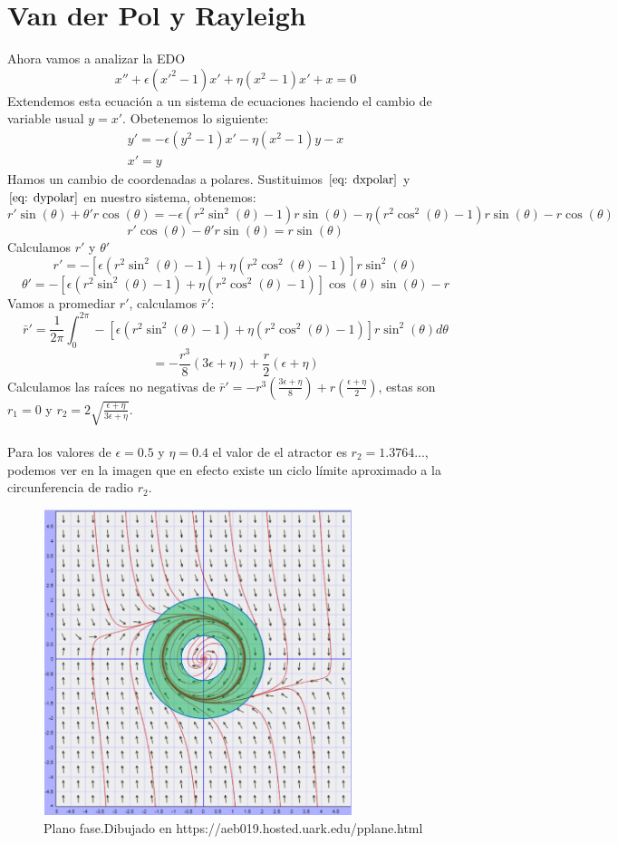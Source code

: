 \documentclass[12pt, a4paper]{report}
\begin{document}
\section{Van der Pol y Rayleigh}
Ahora vamos a analizar la EDO
\begin{equation}\label{eq: vdpr}
	x''+\epsilon(x'^2-1)x'+\eta(x^2-1)x'+x=0
\end{equation}
Extendemos esta ecuación a un sistema de ecuaciones haciendo el
cambio de variable usual $y=x'$. Obetenemos lo siguiente:
\begin{equation}\label{eq: vpdrsis}
	\begin{matrix}
		y'=-\epsilon(y^2-1)x'-\eta(x^2-1)y-x \\
		x'=y
	\end{matrix}
\end{equation}
Hamos un cambio de coordenadas a polares. Sustituimos $\eqref{eq: dxpolar}$ y
$\eqref{eq: dypolar}$ en nuestro sistema, obtenemos:
$$r'\sin(\theta)+\theta'r\cos(\theta)=-\epsilon(r^2\sin^2(\theta)-1)r\sin(\theta)-\eta(r^2\cos^2(\theta)-1)r\sin(\theta)-r\cos(\theta)$$
$$r'\cos(\theta)-\theta'r\sin(\theta)=r\sin(\theta)$$
Calculamos $r'$ y $\theta'$
\begin{equation}\label{eq: drvdpr}
	r'=-[\epsilon(r^2\sin^2(\theta)-1)+\eta(r^2\cos^2(\theta)-1)]r\sin^2(\theta)
\end{equation}
$$\theta'=-[\epsilon(r^2\sin^2(\theta)-1)+\eta(r^2\cos^2(\theta)-1)]\cos(\theta)\sin(\theta)-r$$
Vamos a promediar $r'$, calculamos $\bar{r}'$:
$$\bar{r}'=\frac{1}{2\pi}\int_0^{2\pi}-[\epsilon(r^2\sin^2(\theta)-1)+\eta(r^2\cos^2(\theta)-1)]r\sin^2(\theta)d\theta$$
$$=-\frac{r^3}{8}(3\epsilon+\eta)+\frac{r}{2}(\epsilon+\eta)$$
Calculamos las raíces no negativas de $\bar{r}'=-r^3(\frac{3\epsilon+\eta}{8})+r(\frac{\epsilon+\eta}{2})$, estas son
$r_1=0$ y $r_2=2\sqrt{\frac{\epsilon+\eta}{3\epsilon+\eta}}$.\\
\\Para los valores de $\epsilon=0.5$ y $\eta=0.4$ el valor de el atractor es $r_2=1.3764\dots$, podemos ver en la imagen que en efecto
existe un ciclo límite aproximado a la circunferencia de radio $r_2$.

\begin{figure}[h]
	\centering
	\includegraphics[width=9cm]{VDP-R.png}
	\caption{Plano fase.Dibujado en https://aeb019.hosted.uark.edu/pplane.html}
\end{figure}

\newpage
\end{document}
